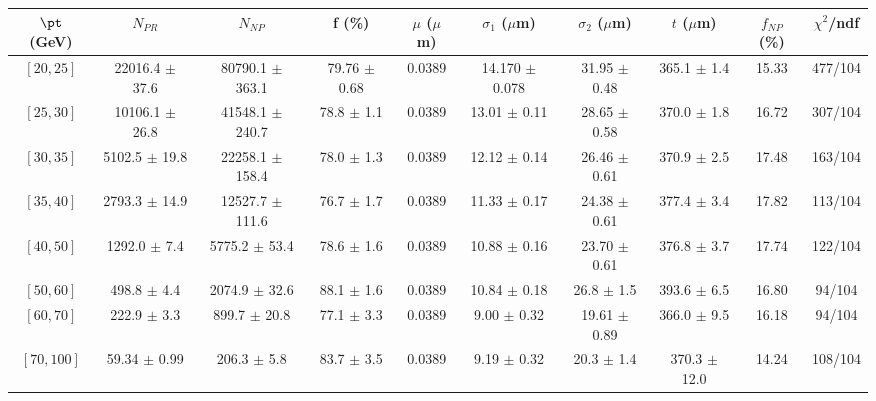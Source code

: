 \begin{tabular}{c||c|c|c|c|c|c|c||c|c}
$\pt$ (GeV) & $N_{PR}$ & $N_{NP}$ & f (\%) & $\mu$ ($\mu$m) & $\sigma_1$ ($\mu$m) & $\sigma_2$ ($\mu$m)  & $t$ ($\mu$m) & $f_{NP}$ (\%) & $\chi^2$/ndf \\
\hline
$[20, 25]$ & 22016.4 $\pm$ 37.6 & 80790.1 $\pm$ 363.1 & 79.76 $\pm$ 0.68 & 0.0389 & 14.170 $\pm$ 0.078 & 31.95 $\pm$ 0.48 & 365.1 $\pm$ 1.4 & 15.33 & 477/104\\
$[25, 30]$ & 10106.1 $\pm$ 26.8 & 41548.1 $\pm$ 240.7 & 78.8 $\pm$ 1.1 & 0.0389 & 13.01 $\pm$ 0.11 & 28.65 $\pm$ 0.58 & 370.0 $\pm$ 1.8 & 16.72 & 307/104\\
$[30, 35]$ & 5102.5 $\pm$ 19.8 & 22258.1 $\pm$ 158.4 & 78.0 $\pm$ 1.3 & 0.0389 & 12.12 $\pm$ 0.14 & 26.46 $\pm$ 0.61 & 370.9 $\pm$ 2.5 & 17.48 & 163/104\\
$[35, 40]$ & 2793.3 $\pm$ 14.9 & 12527.7 $\pm$ 111.6 & 76.7 $\pm$ 1.7 & 0.0389 & 11.33 $\pm$ 0.17 & 24.38 $\pm$ 0.61 & 377.4 $\pm$ 3.4 & 17.82 & 113/104\\
$[40, 50]$ & 1292.0 $\pm$ 7.4 & 5775.2 $\pm$ 53.4 & 78.6 $\pm$ 1.6 & 0.0389 & 10.88 $\pm$ 0.16 & 23.70 $\pm$ 0.61 & 376.8 $\pm$ 3.7 & 17.74 & 122/104\\
$[50, 60]$ & 498.8 $\pm$ 4.4 & 2074.9 $\pm$ 32.6 & 88.1 $\pm$ 1.6 & 0.0389 & 10.84 $\pm$ 0.18 & 26.8 $\pm$ 1.5 & 393.6 $\pm$ 6.5 & 16.80 & 94/104\\
$[60, 70]$ & 222.9 $\pm$ 3.3 & 899.7 $\pm$ 20.8 & 77.1 $\pm$ 3.3 & 0.0389 & 9.00 $\pm$ 0.32 & 19.61 $\pm$ 0.89 & 366.0 $\pm$ 9.5 & 16.18 & 94/104\\
$[70, 100]$ & 59.34 $\pm$ 0.99 & 206.3 $\pm$ 5.8 & 83.7 $\pm$ 3.5 & 0.0389 & 9.19 $\pm$ 0.32 & 20.3 $\pm$ 1.4 & 370.3 $\pm$ 12.0 & 14.24 & 108/104\\
\end{tabular}
